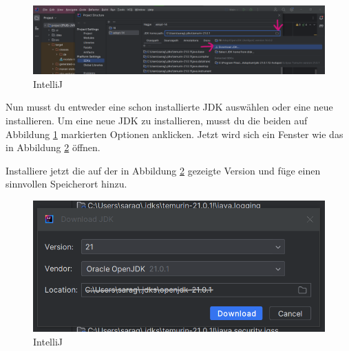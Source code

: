 \begin{figure}[h!]
\begin{center}
\includegraphics[width=\linewidth]{./figures/IntelliJ JDK 2.PNG}
\end{center}
\caption{IntelliJ}
\label{fig:IntelliJVersion}
\end{figure}

Nun musst du entweder eine schon installierte JDK auswählen oder eine neue installieren. 
Um eine neue JDK zu installieren, musst du die beiden auf Abbildung \ref{fig:IntelliJVersion} markierten Optionen anklicken. 
Jetzt wird sich ein Fenster wie das in Abbildung \ref{fig:javaversion} öffnen.
\newpage

Installiere jetzt die auf der in Abbildung \ref{fig:javaversion} gezeigte Version und füge einen sinnvollen Speicherort hinzu.
\begin{figure}[h]
    \begin{center}
        \includegraphics[width=\linewidth]{./figures/IntelliJ JDK 3.PNG}
    \end{center}
    \caption{IntelliJ} 
    \label{fig:javaversion}
\end{figure}

